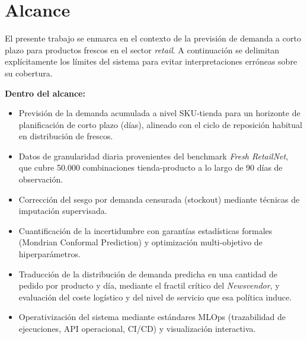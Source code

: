 \section{Alcance}
El presente trabajo se enmarca en el contexto de la previsión de demanda a corto plazo para productos frescos en el sector \textit{retail}. A continuación se delimitan explícitamente los límites del sistema para evitar interpretaciones erróneas sobre su cobertura.

\textbf{Dentro del alcance:}
\begin{itemize}
    \item Previsión de la demanda acumulada a nivel SKU-tienda para un horizonte de planificación de corto plazo (días), alineado con el ciclo de reposición habitual en distribución de frescos.
    \item Datos de granularidad diaria provenientes del benchmark \textit{Fresh RetailNet}, que cubre 50.000 combinaciones tienda-producto a lo largo de 90 días de observación.
    \item Corrección del sesgo por demanda censurada (stockout) mediante técnicas de imputación supervisada.
    \item Cuantificación de la incertidumbre con garantías estadísticas formales (Mondrian Conformal Prediction) y optimización multi-objetivo de hiperparámetros.
    \item Traducción de la distribución de demanda predicha en una cantidad de pedido por producto y día, mediante el fractil crítico del \textit{Newsvendor}, y evaluación del coste logístico y del nivel de servicio que esa política induce.
    \item Operativización del sistema mediante estándares MLOps (trazabilidad de ejecuciones, API operacional, CI/CD) y visualización interactiva.
\end{itemize}

